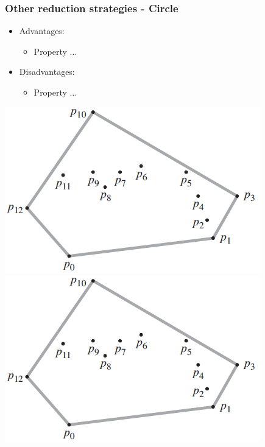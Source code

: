 \begin{frame}
\frametitle{Other reduction strategies - Circle}
\begin{multicols}{2}
	\begin{itemize}
		\item Advantages:
		\begin{itemize}
			\item Property ...
		\end{itemize}
		\item Disadvantages:
		\begin{itemize}
			\item Property ...
		\end{itemize}
	\end{itemize}
\columnbreak
	\begin{center}
		\includegraphics[scale=0.5]{graphics/convexHull-example}\\
		\includegraphics[scale=0.5]{graphics/convexHull-example}
	\end{center}
\end{multicols}
\end{frame}	
